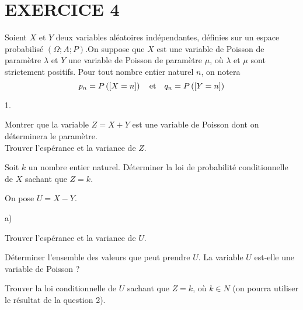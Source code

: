 \documentclass[11pt]{article}%
\begin{document}
\section*{EXERCICE 4}

Soient $X$ et $Y$ deux variables aléatoires indépendantes, définies sur
un
espace probabilisé $(\Omega ;A;P).$On suppose que $X$ est une variable
de
Poisson de paramètre $\lambda $ et $Y$ une variable de Poisson de
paramètre $\mu $, où $\lambda $ et $\mu $ sont strictement positifs.
Pour tout nombre
entier naturel $n$, on notera
\[
p_{n} = P\left(\left[ {X = n} \right]\right)\quad \text{et}\quad q_{n} =
P\left(\left[ {Y = n} \right]\right)
\]

\begin{noliste}{1.}
 \setlength{\itemsep}{4mm}
\item Montrer que la variable $Z = X + Y$ est une variable de Poisson
dont on déterminera le paramètre.\\
Trouver l'espérance et la variance de $Z.$

\item Soit $k$ un nombre entier naturel. Déterminer la loi de
probabilité
conditionnelle de $X$ sachant que $Z = k.$

\item On pose $U = X-Y.$

\begin{noliste}{a)}
 \setlength{\itemsep}{2mm}
\item Trouver l'espérance et la variance de $U$.

\item Déterminer l'ensemble des valeurs que peut prendre $U$. La
variable $U$
est-elle une variable de Poisson ?

\item Trouver la loi conditionnelle de $U$ sachant que $Z = k$, où
$k\in N$
(on pourra utiliser le résultat de la question 2).
\end{noliste}
\end{noliste}

\label{fin}
\end{document}
